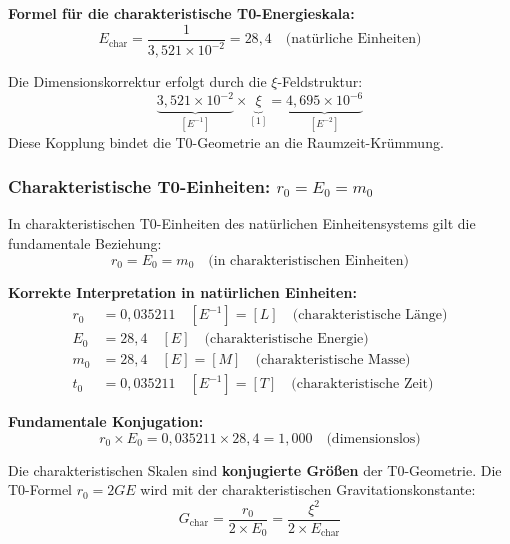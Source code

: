 \documentclass[11pt,a4paper]{article}
\begin{document}
\textbf{Formel für die charakteristische T0-Energieskala:}
\begin{equation}
	\boxed{E_{\text{char}} = \frac{1}{3{,}521 \times 10^{-2}} = 28{,}4 \quad \text{(natürliche Einheiten)}}
\end{equation}

Die Dimensionskorrektur erfolgt durch die $\xi$-Feldstruktur:
\begin{equation}
	\underbrace{3{,}521 \times 10^{-2}}_{[E^{-1}]} \times \underbrace{\xi}_{[1]} = \underbrace{4{,}695 \times 10^{-6}}_{[E^{-2}]}
\end{equation}
Diese Kopplung bindet die T0-Geometrie an die Raumzeit-Krümmung.

\subsubsection{Charakteristische T0-Einheiten: $r_0 = E_0 = m_0$}

In charakteristischen T0-Einheiten des natürlichen Einheitensystems gilt die fundamentale Beziehung:
\begin{equation}
	r_0 = E_0 = m_0 \quad \text{(in charakteristischen Einheiten)}
\end{equation}

\textbf{Korrekte Interpretation in natürlichen Einheiten:}
\begin{align}
	r_0 &= 0{,}035211 \quad [E^{-1}] = [L] \quad \text{(charakteristische Länge)} \\
	E_0 &= 28{,}4 \quad [E] \quad \text{(charakteristische Energie)} \\
	m_0 &= 28{,}4 \quad [E] = [M] \quad \text{(charakteristische Masse)} \\
	t_0 &= 0{,}035211 \quad [E^{-1}] = [T] \quad \text{(charakteristische Zeit)}
\end{align}

\textbf{Fundamentale Konjugation:}
\begin{equation}
	r_0 \times E_0 = 0{,}035211 \times 28{,}4 = 1{,}000 \quad \text{(dimensionslos)}
\end{equation}

Die charakteristischen Skalen sind \textbf{konjugierte Größen} der T0-Geometrie. Die T0-Formel $r_0 = 2GE$ wird mit der charakteristischen Gravitationskonstante:
\begin{equation}
	G_{\text{char}} = \frac{r_0}{2 \times E_0} = \frac{\xi^2}{2 \times E_{\text{char}}}
\end{equation}
\end{document}
